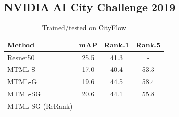 \documentclass[10pt,twocolumn,letterpaper]{article}
\begin{document}


\subsection{NVIDIA AI City Challenge 2019}

\begin{table}[h]
  \centering
  \begin{tabular}{l || c | c | c }
    \hline
    Method & mAP & Rank-1 & Rank-5 \\
    \hline
    Resnet50\cite{tang2019cityflow} & 25.5 & 41.3 & - \\
    \hline
    MTML-S  & 17.0 & 40.4 & 53.3 \\
    MTML-G  & 19.6 & 44.5 & 58.4 \\
    \hdashline
    MTML-SG & 20.6 & 44.1 & 55.8 \\
    \hdashline
    MTML-SG (ReRank) &  & & \\
    \hline
  \end{tabular}
  \caption{Trained/tested on CityFlow}
  \label{T:cityflow_results}
\end{table}
\end{document}
